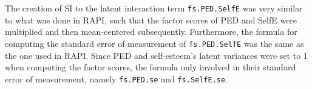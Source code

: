\documentclass[
  man]{apa7}
\newenvironment{Shaded}{\begin{snugshade}}{\end{snugshade}}
\newcommand{\CommentTok}[1]{\textcolor[rgb]{0.56,0.35,0.01}{\textit{#1}}}
\newcommand{\DecValTok}[1]{\textcolor[rgb]{0.00,0.00,0.81}{#1}}
\newcommand{\FunctionTok}[1]{\textcolor[rgb]{0.13,0.29,0.53}{\textbf{#1}}}
\newcommand{\NormalTok}[1]{#1}
\newcommand{\OtherTok}[1]{\textcolor[rgb]{0.56,0.35,0.01}{#1}}
\newcommand{\SpecialCharTok}[1]{\textcolor[rgb]{0.81,0.36,0.00}{\textbf{#1}}}
\begin{document}
\begin{Shaded}
\end{Shaded}

\normalsize

The creation of SI to the latent interaction term \texttt{fs.PED.SelfE} was very similar to what was done in RAPI, such that the factor scores of PED and SelfE were multiplied and then mean-centered subsequently. Furthermore, the formula for computing the standard error of measurement of \texttt{fs.PED.SelfE} was the same as the one used in RAPI. Since PED and self-esteem's latent variances were set to 1 when computing the factor scores, the formula only involved in their standard error of measurement, namely \texttt{fs.PED.se} and \texttt{fs.SelfE.se}.

\footnotesize
\end{document}
